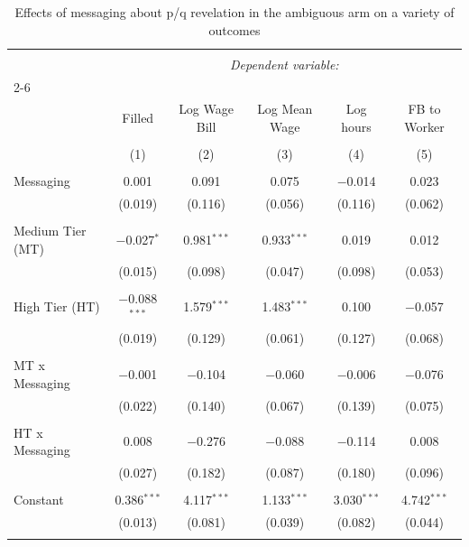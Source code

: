 
\begin{table}[!htbp] \centering 
  \caption{Effects of messaging about p/q revelation in the ambiguous arm on a variety of outcomes} 
  \label{tab:ats} 
\footnotesize 
\begin{tabular}{@{\extracolsep{5pt}}lccccc} 
\\[-1.8ex]\hline 
\hline \\[-1.8ex] 
 & \multicolumn{5}{c}{\textit{Dependent variable:}} \\ 
\cline{2-6} 
\\[-1.8ex] & Filled & Log Wage Bill & Log Mean Wage & Log hours & FB to Worker \\ 
\\[-1.8ex] & (1) & (2) & (3) & (4) & (5)\\ 
\hline \\[-1.8ex] 
 Messaging & 0.001 & 0.091 & 0.075 & $-$0.014 & 0.023 \\ 
  & (0.019) & (0.116) & (0.056) & (0.116) & (0.062) \\ 
  & & & & & \\ 
 Medium Tier (MT) & $-$0.027$^{*}$ & 0.981$^{***}$ & 0.933$^{***}$ & 0.019 & 0.012 \\ 
  & (0.015) & (0.098) & (0.047) & (0.098) & (0.053) \\ 
  & & & & & \\ 
 High Tier (HT) & $-$0.088$^{***}$ & 1.579$^{***}$ & 1.483$^{***}$ & 0.100 & $-$0.057 \\ 
  & (0.019) & (0.129) & (0.061) & (0.127) & (0.068) \\ 
  & & & & & \\ 
 MT x Messaging & $-$0.001 & $-$0.104 & $-$0.060 & $-$0.006 & $-$0.076 \\ 
  & (0.022) & (0.140) & (0.067) & (0.139) & (0.075) \\ 
  & & & & & \\ 
 HT x Messaging & 0.008 & $-$0.276 & $-$0.088 & $-$0.114 & 0.008 \\ 
  & (0.027) & (0.182) & (0.087) & (0.180) & (0.096) \\ 
  & & & & & \\ 
 Constant & 0.386$^{***}$ & 4.117$^{***}$ & 1.133$^{***}$ & 3.030$^{***}$ & 4.742$^{***}$ \\ 
  & (0.013) & (0.081) & (0.039) & (0.082) & (0.044) \\ 
  & & & & & \\ 

\end{tabular}
\end{table}
